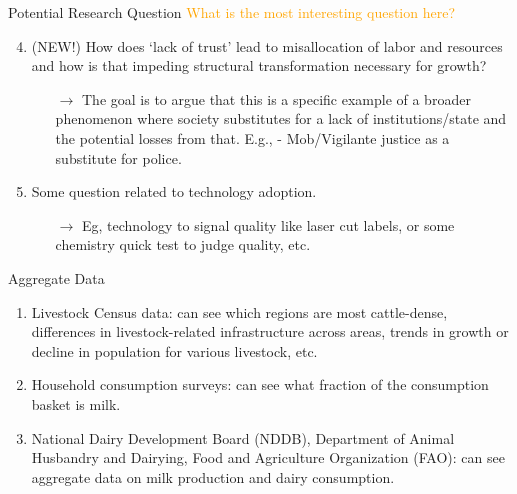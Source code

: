 \documentclass[12pt, aspectratio=169]{beamer}
\begin{document}
\begin{frame}[noframenumbering] {Potential Research Question}
\small
\textcolor{orange}{What is the most interesting question here?}
\begin{enumerate}
\setcounter{enumi}{3}
    \item (NEW!) How does `lack of trust' lead to misallocation of labor and resources and how is that impeding structural transformation necessary for growth?
    \begin{itemize}
    \item [$\rightarrow$] The goal is to argue that this is a specific example of a broader phenomenon where society substitutes for a lack of institutions/state and the potential losses from that. E.g., - Mob/Vigilante justice as a substitute for police.  
    \end{itemize}
    \item Some question related to technology adoption.
    \begin{itemize}
    \item [$\rightarrow$] Eg, technology to signal quality like laser cut labels, or some chemistry quick test to judge quality, etc.
    \end{itemize}
\end{enumerate}
\end{frame}


\begin{frame}{Aggregate Data}
\begin{enumerate}
    \item Livestock Census data: can see which regions are most cattle-dense, differences in livestock-related infrastructure across areas, trends in growth or decline in population for various livestock, etc. 
    \item  Household consumption surveys: can see what fraction of the consumption basket is milk.
    \item National Dairy Development Board (NDDB), Department of Animal Husbandry and Dairying, Food and Agriculture Organization (FAO): can see aggregate data on milk production and dairy consumption. 
\end{enumerate}
\end{frame}
\end{document}
